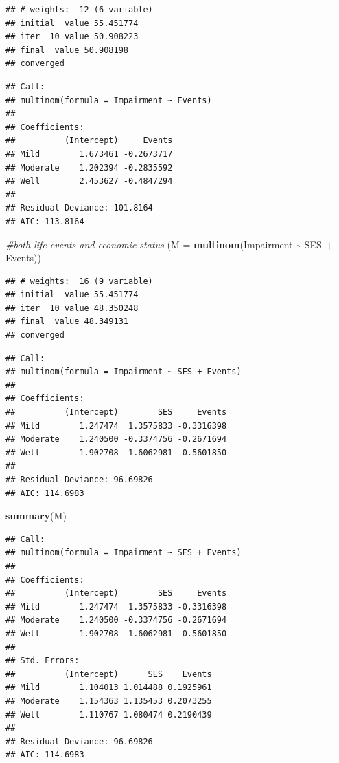 \documentclass[
]{article}
\newenvironment{Shaded}{\begin{snugshade}}{\end{snugshade}}
\newcommand{\AttributeTok}[1]{\textcolor[rgb]{0.13,0.29,0.53}{#1}}
\newcommand{\CommentTok}[1]{\textcolor[rgb]{0.56,0.35,0.01}{\textit{#1}}}
\newcommand{\FunctionTok}[1]{\textcolor[rgb]{0.13,0.29,0.53}{\textbf{#1}}}
\newcommand{\NormalTok}[1]{#1}
\newcommand{\SpecialCharTok}[1]{\textcolor[rgb]{0.81,0.36,0.00}{\textbf{#1}}}
\begin{document}
\begin{verbatim}
## # weights:  12 (6 variable)
## initial  value 55.451774 
## iter  10 value 50.908223
## final  value 50.908198 
## converged
\end{verbatim}

\begin{verbatim}
## Call:
## multinom(formula = Impairment ~ Events)
## 
## Coefficients:
##          (Intercept)     Events
## Mild        1.673461 -0.2673717
## Moderate    1.202394 -0.2835592
## Well        2.453627 -0.4847294
## 
## Residual Deviance: 101.8164 
## AIC: 113.8164
\end{verbatim}

\begin{Shaded}
\begin{Highlighting}[]
\CommentTok{\#both life events and economic status }
\NormalTok{(}\AttributeTok{M =} \FunctionTok{multinom}\NormalTok{(Impairment }\SpecialCharTok{\textasciitilde{}}\NormalTok{ SES }\SpecialCharTok{+}\NormalTok{ Events))}
\end{Highlighting}
\end{Shaded}

\begin{verbatim}
## # weights:  16 (9 variable)
## initial  value 55.451774 
## iter  10 value 48.350248
## final  value 48.349131 
## converged
\end{verbatim}

\begin{verbatim}
## Call:
## multinom(formula = Impairment ~ SES + Events)
## 
## Coefficients:
##          (Intercept)        SES     Events
## Mild        1.247474  1.3575833 -0.3316398
## Moderate    1.240500 -0.3374756 -0.2671694
## Well        1.902708  1.6062981 -0.5601850
## 
## Residual Deviance: 96.69826 
## AIC: 114.6983
\end{verbatim}

\begin{Shaded}
\begin{Highlighting}[]
\FunctionTok{summary}\NormalTok{(M)}
\end{Highlighting}
\end{Shaded}

\begin{verbatim}
## Call:
## multinom(formula = Impairment ~ SES + Events)
## 
## Coefficients:
##          (Intercept)        SES     Events
## Mild        1.247474  1.3575833 -0.3316398
## Moderate    1.240500 -0.3374756 -0.2671694
## Well        1.902708  1.6062981 -0.5601850
## 
## Std. Errors:
##          (Intercept)      SES    Events
## Mild        1.104013 1.014488 0.1925961
## Moderate    1.154363 1.135453 0.2073255
## Well        1.110767 1.080474 0.2190439
## 
## Residual Deviance: 96.69826 
## AIC: 114.6983
\end{verbatim}
\end{document}
